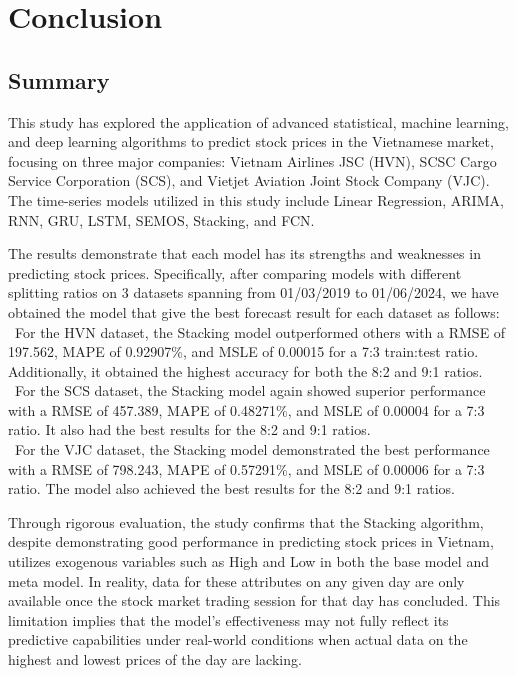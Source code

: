 \documentclass{ieeeojies}
\begin{document}
\section{Conclusion}
\subsection{Summary}
This study has explored the application of advanced statistical, machine learning, and deep learning algorithms to predict stock prices in the Vietnamese market, focusing on three major companies: Vietnam Airlines JSC (HVN), SCSC Cargo Service Corporation (SCS), and Vietjet Aviation Joint Stock Company (VJC). The time-series models utilized in this study include Linear Regression, ARIMA, RNN, GRU, LSTM, SEMOS, Stacking, and FCN.

The results demonstrate that each model has its strengths and weaknesses in predicting stock prices. Specifically,  after comparing models with different splitting ratios on 3 datasets spanning from 01/03/2019 to 01/06/2024, we have obtained the model that give the best forecast result for each dataset as follows: \\
\indent\textbullet\ For the HVN dataset, the Stacking model outperformed others with a RMSE of 197.562, MAPE of 0.92907\%, and MSLE of 0.00015 for a 7:3 train:test ratio. Additionally, it obtained the highest accuracy for both the 8:2 and 9:1 ratios.\\
\indent\textbullet\ For the SCS dataset, the Stacking model again showed superior performance with a RMSE of 457.389, MAPE of 0.48271\%, and MSLE of 0.00004 for a 7:3 ratio. 
It also had the best results for the 8:2 and 9:1 ratios.\\
\indent\textbullet\ For the VJC dataset, the Stacking model demonstrated the best performance with a RMSE of 798.243, MAPE of 0.57291\%, and MSLE of 0.00006 for a 7:3 ratio. The model also achieved the best results for the 8:2 and 9:1 ratios.

Through rigorous evaluation, the study confirms that the Stacking algorithm, despite demonstrating good performance in predicting stock prices in Vietnam, utilizes exogenous variables such as High and Low in both the base model and meta model. In reality, data for these attributes on any given day are only available once the stock market trading session for that day has concluded. This limitation implies that the model's effectiveness may not fully reflect its predictive capabilities under real-world conditions when actual data on the highest and lowest prices of the day are lacking.
\end{document}

